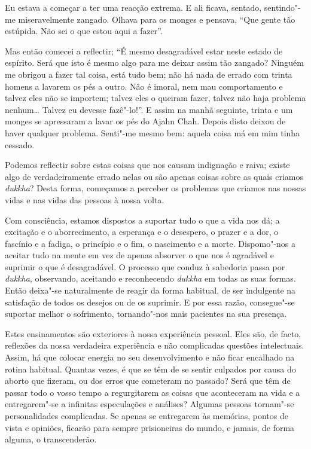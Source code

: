 Eu estava a começar a ter uma reacção extrema. E ali ficava, sentado,
sentindo"-me miseravelmente zangado. Olhava para os monges e pensava, “Que gente
tão estúpida. Não sei o que estou aqui a fazer”.

Mas então comecei a reflectir; “É mesmo desagradável estar neste estado de
espírito. Será que isto é mesmo algo para me deixar assim tão zangado? Ninguém
me obrigou a fazer tal coisa, está tudo bem; não há nada de errado com trinta
homens a lavarem os pés a outro. Não é imoral, nem mau comportamento e talvez
eles não se importem; talvez eles o queiram fazer, talvez não haja problema
nenhum\ldots{} Talvez eu devesse fazê"-lo!”. E assim na manhã seguinte, trinta e
um monges se apressaram a lavar os pés do Ajahn Chah. Depois disto deixou de
haver qualquer problema. Senti"-me mesmo bem: aquela coisa má em mim tinha
cessado.

Podemos reflectir sobre estas coisas que nos causam indignação e raiva; existe
algo de verdadeiramente errado nelas ou são apenas coisas sobre as quais criamos
\emph{dukkha}? Desta forma, começamos a perceber os problemas que criamos nas
nossas vidas e nas vidas das pessoas à nossa volta.

Com consciência, estamos dispostos a suportar tudo o que a vida nos dá; a
excitação e o aborrecimento, a esperança e o desespero, o prazer e a dor, o
fascínio e a fadiga, o princípio e o fim, o nascimento e a morte. Dispomo"-nos a
aceitar tudo na mente em vez de apenas absorver o que nos é agradável e suprimir
o que é desagradável. O processo que conduz à sabedoria passa por \emph{dukkha},
observando, aceitando e reconhecendo \emph{dukkha} em todas as suas formas.
Então deixa"-se naturalmente de reagir da forma habitual, de ser indulgente
na satisfação de todos os desejos ou de os suprimir. E por essa razão,
consegue"-se suportar melhor o sofrimento, tornando"-nos mais pacientes na sua presença.

Estes ensinamentos são exteriores à nossa experiência pessoal. Eles são, de
facto, reflexões da nossa verdadeira experiência e não complicadas questões
intelectuais. Assim, há que colocar energia no seu desenvolvimento e não ficar
encalhado na rotina habitual. Quantas vezes, é que se têm de se sentir culpados
por causa do aborto que fizeram, ou dos erros que cometeram no passado? Será que
têm de passar todo o vosso tempo a regurgitarem as coisas que aconteceram na vida e
a entregarem"-se a infinitas especulações e análises? Algumas pessoas tornam"-se
personalidades complicadas. Se apenas se entregarem às memórias, pontos de vista
e opiniões, ficarão para sempre prisioneiras do mundo, e jamais, de forma
alguma, o transcenderão.

